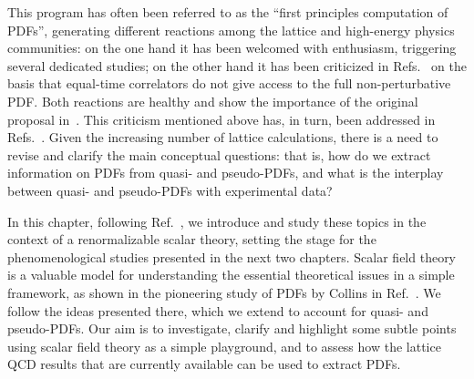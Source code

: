 %
This program has often been referred to as the ``first
principles computation of PDFs'', generating different reactions among the
lattice and high-energy physics communities: on the one hand it has been
welcomed with enthusiasm, triggering several dedicated studies; on the other
hand it has been criticized in Refs.~\cite{Rossi:2017muf,Rossi:2018zkn} on the
basis that equal-time correlators do not give access to the full
non-perturbative PDF. Both reactions are healthy and show the importance of the
original proposal in~\cite{PhysRevLett.110.262002}. This criticism mentioned
above has, in turn, been addressed in
Refs.~\cite{Radyushkin:2018nbf,Karpie:2018zaz}. Given the increasing number of
lattice calculations, there is a need to revise and clarify the main conceptual
questions: that is, how do we extract information on PDFs from quasi- and
pseudo-PDFs, and what is the interplay between quasi- and pseudo-PDFs with
experimental data?

In this chapter, following Ref.~\cite{DelDebbio:2020cbz}, we introduce and study these topics in the context of a renormalizable scalar
theory, setting the stage for the phenomenological studies presented in the next two chapters.
Scalar field theory is a valuable model for understanding the essential
theoretical issues in a simple framework, as shown in the pioneering study of
PDFs by Collins in Ref.~\cite{Collins:1980ui}. We follow the ideas presented
there, which we extend to account for quasi- and pseudo-PDFs. Our aim is to
investigate, clarify and highlight some subtle points using scalar field theory
as a simple playground, and to assess how the lattice QCD results that are
currently available can be used to extract PDFs. 

